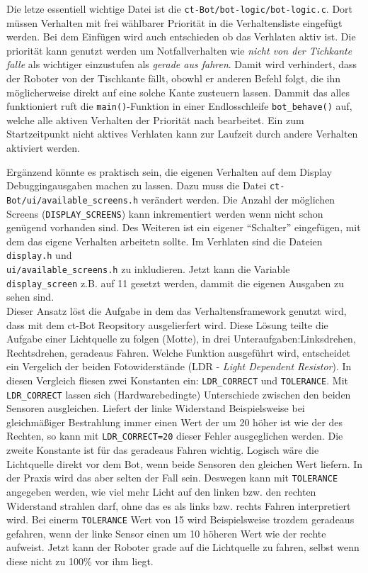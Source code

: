 Die letze essentiell wichtige Datei ist die \verb+ct-Bot/bot-logic/bot-logic.c+.
Dort müssen Verhalten mit frei wählbarer Priorität in die Verhaltensliste
eingefügt werden. Bei dem Einfügen wird auch entschieden ob das Verhlaten
aktiv ist. Die priorität kann genutzt werden um Notfallverhalten wie
\textit{nicht von der Tichkante falle} als wichtiger einzustufen als
\textit{gerade aus fahren}. Damit wird verhindert, dass der Roboter von der
Tischkante fällt, obowhl er anderen Befehl folgt, die ihn möglicherweise
direkt auf eine solche Kante zusteuern lassen. Dammit das alles funktioniert
ruft die \verb+main()+-Funktion in einer Endlosschleife \verb+bot_behave()+ auf,
welche alle aktiven Verhalten der Priorität nach bearbeitet. Ein zum
Startzeitpunkt nicht aktives Verhlaten kann zur Laufzeit durch andere Verhalten
aktiviert werden.

Ergänzend könnte es praktisch sein, die eigenen Verhalten auf dem Display
Debuggingausgaben machen zu lassen. Dazu muss die Datei
\verb+ct-Bot/ui/available_screens.h+ verändert werden. Die Anzahl
der möglichen Screens (\verb+DISPLAY_SCREENS+) kann inkrementiert werden
wenn nicht schon genügend vorhanden sind. Des Weiteren ist ein eigener
"`Schalter"' eingefügen, mit dem das eigene Verhalten arbeitetn sollte.
Im Verhlaten sind die Dateien \verb+display.h+ und \\
\verb+ui/available_screens.h+ zu inkludieren. Jetzt kann die Variable
\verb+display_screen+ z.B. auf 11 gesetzt werden, dammit die eigenen
Ausgaben zu sehen sind. \\


Dieser Ansatz löst die Aufgabe in dem das Verhaltensframework
genutzt wird, dass mit dem ct-Bot Reopsitory ausgelierfert wird.
Diese Lösung teilte die Aufgabe einer Lichtquelle zu folgen (Motte), in drei
Unteraufgaben:Linksdrehen, Rechtsdrehen, geradeaus Fahren.
Welche Funktion ausgeführt wird, entscheidet ein Vergelich der beiden Fotowiderstände
(LDR - \textit{Light Dependent Resistor}). In diesen Vergleich fliesen zwei Konstanten ein:
\verb+LDR_CORRECT+ und \verb+TOLERANCE+. Mit \verb+LDR_CORRECT+ lassen sich
(Hardwarebedingte) Unterschiede zwischen den beiden Sensoren ausgleichen. Liefert
der linke Widerstand Beispielsweise bei gleichmäßiger Bestrahlung immer einen
Wert der um 20 höher ist wie der des Rechten, so kann mit \verb+LDR_CORRECT=20+ dieser
Fehler ausgeglichen werden. Die zweite Konstante ist für das geradeaus Fahren wichtig.
Logisch wäre die Lichtquelle direkt vor dem Bot, wenn beide Sensoren den gleichen
Wert liefern. In der Praxis wird das aber selten der Fall sein. Deswegen kann mit
\verb+TOLERANCE+ angegeben werden, wie viel mehr Licht auf den linken bzw. den rechten
Widerstand strahlen darf, ohne das es als links bzw. rechts Fahren interpretiert wird.
Bei einerm \verb+TOLERANCE+ Wert von 15 wird Beispielsweise trozdem geradeaus gefahren,
wenn der linke Sensor einen um 10 höheren Wert wie der rechte aufweist. Jetzt kann
der Roboter grade auf die Lichtquelle zu fahren, selbst wenn diese nicht zu 100\%
vor ihm liegt. \\

